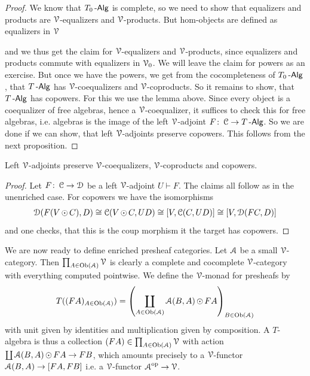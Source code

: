\documentclass[a4paper,11pt,oneside,openany]{scrbook}
\begin{document}
\begin{proof}
   We know that $T_{0}\Alg$ is complete, so we need to show that equalizers and products are $\V$-equalizers and $\V$-products. But hom-objects are 
   defined as equalizers in $\V$
      \begin{center}
      \end{center}
   and we thus get the claim for $\V$-equalizers and $\V$-products, since equalizers and products commute with equalizers in $\V_{0}$. We will leave the
   claim for powers as an exercise. But once we have the powers, we get from the cocompleteness of $T_{0}\Alg$, that $T\Alg$ has $\V$-coequalizers and
   $\V$-coproducts. So it remains to show, that $T\Alg$ has copowers. For this we use the lemma above. Since every object is a coequalizer of free 
   algebras, hence a $\V$-coequalizer, it suffices to check this for free algebras, i.e. algebras is the image of the left $\V$-adjoint 
   $F \from \C \to T\Alg$. So we are done if we can show, that left $\V$-adjoints preserve copowers. This follows from the next proposition. 
\end{proof}

\begin{prop}
   Left $\V$-adjoints preserve $\V$-coequalizers, $\V$-coproducts and copowers.
\end{prop}

\begin{proof}
   Let $F \from \C \to \D$ be a left $\V$-adjoint $U\vdash F$. The claims all follow as in the unenriched case. For copowers we have the isomorphisms
      \begin{align*}
         \D(F(V\copw C),D) \iso \C(V\copw C,UD) \iso \lbrack V,\C(C,UD) \rbrack \iso \lbrack V,\D(FC,D) \rbrack 
      \end{align*}
    and one checks, that this is the coup morphism it the target has copowers. 
\end{proof}

We are now ready to define enriched presheaf categories. Let $\A$ be a small $\V$-category. Then $\prod_{A \in \Ob(\A)}\V$ is clearly a complete and 
cocomplete $\V$-category with everything computed pointwise. We define the $\V$-monad for presheafs by 
   \begin{align*}
      T((FA)_{A \in \Ob(\A)}) = \left(\coprod_{A \in \Ob(\A)}\A(B,A)\copw FA\right)_{B \in \Ob(\A)}
   \end{align*} 
with unit given by identities and multiplication given by composition. A $T$-algebra is thus a collection $(FA) \in \prod_{A \in \Ob(\A)}\V$ with action 
$\coprod \A(B,A) \copw FA \to FB$, which amounts precisely to a $\V$-functor $\A(B,A) \to [FA,FB]$ i.e. a $\V$-functor $\A^{\op} \to \V$.
\end{document}
